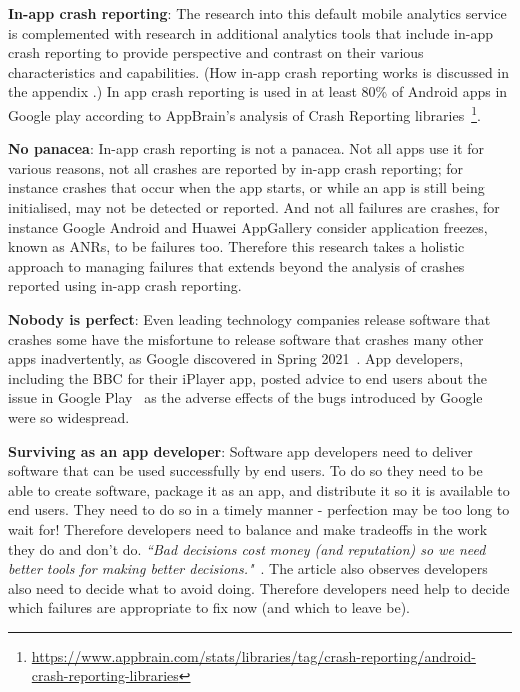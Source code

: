 \textbf{In-app crash reporting}: The research into this default mobile analytics service is complemented with research in additional analytics tools that include in-app crash reporting to provide perspective and contrast on their various characteristics and capabilities. (How in-app crash reporting works is discussed in the appendix \href{{app:crash-recording-and-reporting-in-android}}{}.) In app crash reporting is used in at least 80\% of Android apps in Google play according to AppBrain's analysis of Crash Reporting libraries~\footnote{\url{https://www.appbrain.com/stats/libraries/tag/crash-reporting/android-crash-reporting-libraries}}.


\textbf{No panacea}: In-app crash reporting is not a panacea. Not all apps use it for various reasons, not all crashes are reported by in-app crash reporting; for instance crashes that occur when the app starts, or while an app is still being initialised, may not be detected or reported. And not all failures are crashes, for instance Google Android and Huawei AppGallery consider application freezes, known as ANRs, to be failures too. Therefore this research takes a holistic approach to managing failures that extends beyond the analysis of crashes reported using in-app crash reporting.   %

\textbf{Nobody is perfect}: Even leading technology companies release software that crashes some have the misfortune to release software that crashes many other apps inadvertently, as Google discovered in Spring 2021~\citep{bbcnews2021_google_fixes_crashing_android_app_issues}. App developers, including the BBC for their iPlayer app, posted advice to end users about the issue in Google Play~\citep{bbc_iplayer_app_april_2021_webview_information} as the adverse effects of the bugs introduced by Google were so widespread.


\medskip
\textbf{Surviving as an app developer}: Software app developers need to deliver software that can be used successfully by end users. To do so they need to be able to create software, package it as an app, and distribute it so it is available to end users.
%
They need to do so in a timely manner - perfection may be too long to wait for! Therefore developers need to balance and make tradeoffs in the work they do and don't do. \emph{``Bad decisions cost money (and reputation) so we need better tools for making better decisions."}~\citep[p.115]{tantithamthavorn2021_actionable_analytics_tell_me_what_to_do}. The article also observes developers also need to decide what to avoid doing. Therefore developers need help to decide which failures are appropriate to fix now (and which to leave be).

